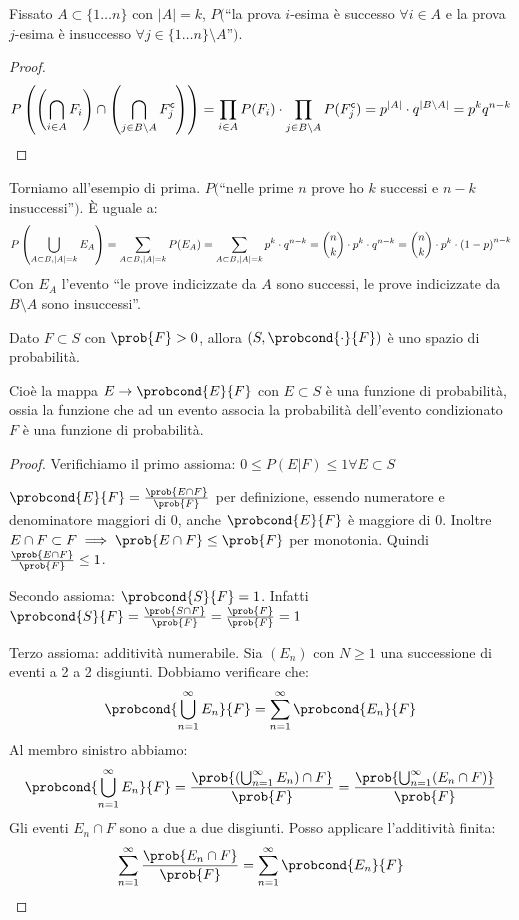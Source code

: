 Fissato $A \subset \{ 1 \dots n \}$ con $|A| = k$, $P($``la prova $i$-esima \`e successo $\forall  i \in A$ e la prova $j$-esima \`e insuccesso $\forall  j \in \{1 \dots n \} \setminus A$''$)$.

\begin{proof}
\[
P \left( \left( \bigcap_{i \in A} F_i \right) \cap \left( \bigcap_{j \in B \setminus A} F_j^{\mathsf{c}} \right) \right) = 
\prod_{i \in A} P(F_i) \cdot \prod_{j \in B \setminus A} P(F_{j}^{\mathsf{c}}) = p^{|A|} \cdot q^{|B \setminus A|} = p^k q^{n-k}
\]
\end{proof}

Torniamo all'esempio di prima. $P($``nelle prime $n$ prove ho $k$ successi e $n-k$ insuccessi''$)$. \`E uguale a:
\[
P \left( \bigcup_{A \subset B, \left\lvert{A}\right\rvert = k} E_A \right) =
\sum_{A \subset B, \left\lvert{A}\right\rvert = k} P(E_A) = \sum_{A \subset B, \left\lvert{A}\right\rvert = k} p^k \cdot q^{n - k} =
\binom{n}{k} \cdot p^k \cdot q^{n - k} =
\binom{n}{k} \cdot p^k \cdot {(1 - p)}^{n - k}
\]
Con $E_A$ l'evento ``le prove indicizzate da $A$ sono successi, le prove indicizzate da $B \setminus A$ sono insuccessi''.

\begin{prop}
Dato $F \subset S$ con $\prob{F} > 0$, allora $(S, \probcond{\cdot}{F})$ \`e uno spazio di probabilit\`a.

Cio\`e la mappa $E \to \probcond{E}{F}$ con $E \subset S$ \`e una funzione di probabilit\`a, ossia la funzione che ad un evento associa la probabilit\`a dell'evento condizionato $F$ \`e una funzione di probabilit\`a.
\end{prop}
\begin{proof}
Verifichiamo il primo assioma: $0 \le P(E|F) \le 1 \forall E \subset S$

$\probcond{E}{F} = \frac{\prob{E \cap F}}{\prob{F}}$ per definizione, essendo numeratore e denominatore maggiori di 0, anche $\probcond{E}{F}$ \`e maggiore di 0. Inoltre $E \cap F \subset F \implies \prob{E \cap F} \le \prob{F}$ per monotonia. Quindi $\frac{ \prob{E \cap F} }{\prob{F}} \le 1$.

Secondo assioma: $\probcond{S}{F} = 1$. Infatti $ \probcond{S}{F} = \frac{\prob{S \cap F}}{\prob{F}} = \frac{\prob{F}}{\prob{F}} = 1$

Terzo assioma: additivit\`a numerabile. Sia $(E_n)$ con $N \ge 1$ una successione di eventi a 2 a 2 disgiunti. Dobbiamo verificare che:
\[
\probcond{\bigcup_{n = 1}^{\infty} E_n}{F} = \sum_{n = 1}^{\infty} \probcond{E_n}{F}
\]
Al membro sinistro abbiamo:
\[
\probcond{\bigcup_{n = 1}^{\infty} E_n}{F} = \frac{\prob{\left( \bigcup_{n = 1}^{\infty} E_n \right) \cap F}}{\prob{F}} = \frac{ \prob{ \bigcup_{n = 1}^{\infty} (E_n \cap F)}}{\prob{F}}
\]
Gli eventi $E_n \cap F$ sono a due a due disgiunti. Posso applicare l'additivit\`a finita:
\[
\sum_{n = 1}^{\infty} \frac{\prob{E_n \cap F}}{\prob{F}} = \sum_{n=1}^{\infty} \probcond{E_n}{F}
\]
\end{proof}

